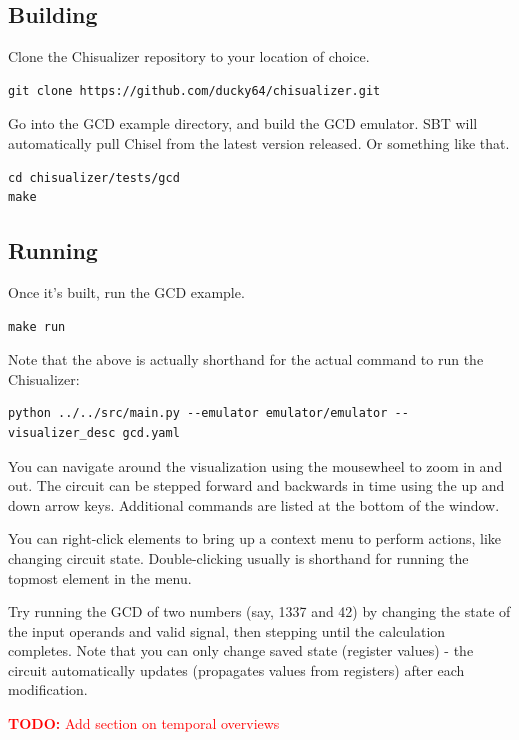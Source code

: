 \documentclass[11pt]{article}
\newcommand{\todo}[1]{\textcolor{red}{\textbf{TODO:} #1}}
\begin{document}
\subsection{Building}
Clone the Chisualizer repository to your location of choice.
\begin{verbatim}
git clone https://github.com/ducky64/chisualizer.git
\end{verbatim}

Go into the GCD example directory, and build the GCD emulator. SBT will automatically pull Chisel from the latest version released. Or something like that.
\begin{verbatim}
cd chisualizer/tests/gcd
make
\end{verbatim}

\subsection{Running}
Once it's built, run the GCD example.
\begin{verbatim}
make run
\end{verbatim}

Note that the above is actually shorthand for the actual command to run the Chisualizer:
\begin{verbatim}
python ../../src/main.py --emulator emulator/emulator --visualizer_desc gcd.yaml
\end{verbatim}

You can navigate around the visualization using the mousewheel to zoom in and out. The circuit can be stepped forward and backwards in time using the up and down arrow keys. Additional commands are listed at the bottom of the window.

You can right-click elements to bring up a context menu to perform actions, like changing circuit state. Double-clicking usually is shorthand for running the topmost element in the menu.

Try running the GCD of two numbers (say, 1337 and 42) by changing the state of the input operands and valid signal, then stepping until the calculation completes. Note that you can only change saved state (register values) - the circuit automatically updates (propagates values from registers) after each modification.

\todo{Add section on temporal overviews}
\end{document}

